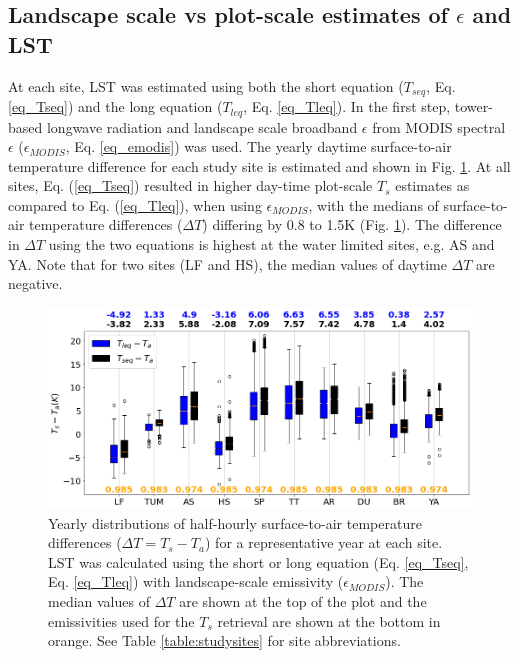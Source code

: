 \documentclass[fleqn,10pt]{wlscirep}
\begin{document}
\subsection{Landscape scale vs plot-scale estimates of $\epsilon$ and LST}
At each site, LST was estimated using both the short equation ($T_{seq}$, Eq. \ref{eq_Tseq}) and the long equation ($T_{leq}$, Eq. \ref{eq_Tleq}). In the first step, tower-based longwave radiation and landscape scale broadband $\epsilon$ from MODIS spectral $\epsilon$ ($\epsilon_{MODIS}$, Eq. \ref{eq_emodis}) was used. The yearly daytime surface-to-air temperature difference for each study site is estimated and shown in Fig. \ref{fig:long_short_eq_epsilon_MODIS}. At all sites, Eq. (\ref{eq_Tseq}) resulted in higher day-time plot-scale $T_{s}$ estimates as compared to Eq. (\ref{eq_Tleq}), when using $\epsilon_{MODIS}$, with the medians of surface-to-air temperature differences ($\Delta T$) differing by 0.8 to 1.5K (Fig. \ref{fig:long_short_eq_epsilon_MODIS}). The difference in $\Delta T$ using the two equations is highest at the water limited sites, e.g. AS and YA. Note that for two sites (LF and HS), the median values of daytime $\Delta T$ are negative.
\begin{figure}[h!]
	\includegraphics[scale=0.35]{Ts_Talocalleqseq.png}
	\centering
    \caption{
     Yearly distributions of half-hourly surface-to-air temperature differences ($\Delta T = T_s - T_a$) for a representative year at each site.  %
    LST was calculated using the short or long equation (Eq. \ref{eq_Tseq}, Eq. \ref{eq_Tleq}) with landscape-scale emissivity ($\epsilon_{MODIS}$).
    The median values of $\Delta T$ are shown at the top of the plot and the emissivities used for the $T_{s}$ retrieval are shown at the bottom in orange. See Table \ref{table:studysites} for site abbreviations.}
	\label{fig:long_short_eq_epsilon_MODIS}
\end{figure}
\end{document}
